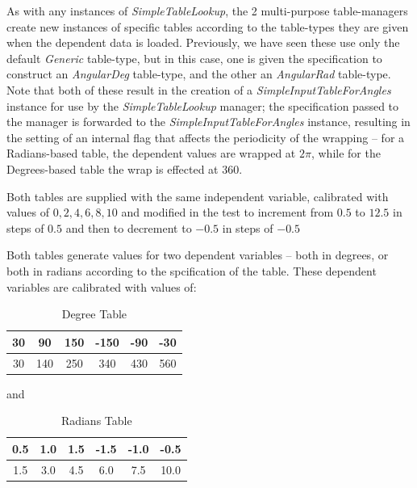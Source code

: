 \documentclass[11pt,fleqn]{report}
\begin{document}
As with any instances of \textit{SimpleTableLookup}, the 2 multi-purpose
table-managers create new instances of specific tables according to the
table-types they are given when the dependent data is loaded. Previously, we
have seen these use only the default \textit{Generic} table-type, but in this
case, one is given the specification to construct an \textit{AngularDeg}
table-type, and the other an \textit{AngularRad} table-type.  Note that both
of these result in the creation of a \textit{SimpleInputTableForAngles}
instance for use by the \textit{SimpleTableLookup} manager; the specification
passed to the manager is forwarded to the \textit{SimpleInputTableForAngles}
instance, resulting in the setting of an internal flag that affects the
periodicity of
the wrapping -- for a Radians-based table, the dependent values are wrapped
at $ 2 \pi$,
while for the Degrees-based table the wrap is effected at $360$.

Both tables are supplied with the same independent variable, calibrated with
values of
${0,2,4,6,8,10}$ and modified in the test to increment from $0.5$ to $12.5$ in
steps of
$0.5$ and then to decrement to $-0.5$ in steps of $-0.5$

Both tables generate values for two dependent variables -- both in degrees, or
both in
radians according to the spcification of the table.  These dependent variables
are
calibrated with values of:

\begin{table}[ht]
\caption{Degree Table}
\begin{center}
\begin{tabular}{|c|c|c|c|c|c|}
\hline
30&90&150&-150&-90&-30\\
\hline
30&140&250&340&430&560\\
\hline
\end{tabular}
\end{center}
\end{table}

and
\begin{table}[ht]
\caption{Radians Table}
\begin{center}
\begin{tabular}{|c|c|c|c|c|c|}
\hline
0.5& 1.0& 1.5&-1.5&-1.0& -0.5\\
\hline
1.5& 3.0& 4.5& 6.0& 7.5& 10.0\\
\hline
\end{tabular}
\end{center}
\end{table}
\end{document}
